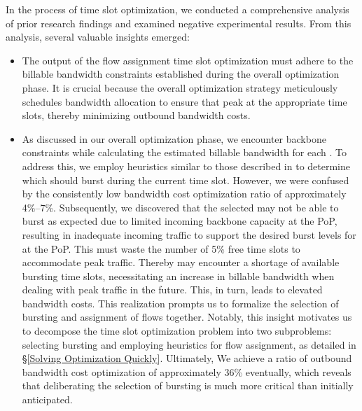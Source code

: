 {In the process of time slot optimization, we conducted a comprehensive analysis of prior research findings and examined negative experimental results. From this analysis, several valuable insights emerged:}
\begin{itemize}
\item {} The output of the flow assignment time slot optimization must adhere to the billable bandwidth constraints established during the overall optimization phase. It is crucial because the overall optimization strategy meticulously schedules bandwidth allocation to ensure that {\egresses} peak at the appropriate time slots, thereby minimizing outbound bandwidth costs.

\item {}
As discussed in our overall optimization phase, we encounter backbone constraints while calculating the estimated billable bandwidth for each {\egress}. To address this, we employ heuristics similar to those described in \cite{singh2021costCascara,goldenberg2004optimizing} to determine which {\egress} should burst during the current time slot.  However, we were confused by the consistently low bandwidth cost optimization ratio of approximately 4\%–7\%. Subsequently, we discovered that the selected {\egresses} may not be able to burst as expected due to limited incoming backbone capacity at the PoP, resulting in inadequate incoming traffic to support the desired burst levels for {\egresses} at the PoP. This must waste the number of 5\% free time slots to accommodate peak traffic. Thereby {\egresses} may encounter a shortage of available bursting time slots, necessitating an increase in billable bandwidth when dealing with peak traffic in the future. This, in turn, leads to elevated bandwidth costs. This realization prompts us to formalize the selection of bursting {\egresses} and assignment of flows together. Notably, this insight motivates us to decompose the time slot optimization problem into two subproblems: selecting bursting {\egresses} and employing heuristics for flow assignment, as detailed in \S\ref{Solving Optimization Quickly}. Ultimately, We achieve a ratio of outbound bandwidth cost optimization of approximately 36\% eventually, which reveals that deliberating the selection of bursting {\egresses} is much more critical than initially anticipated.

\end{itemize}

